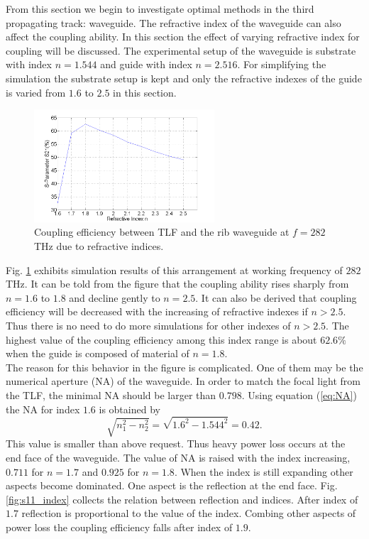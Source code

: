 From this section we begin to investigate optimal methods in the third propagating track: waveguide. The refractive index of the waveguide can also affect the coupling ability. In this section the effect of varying refractive index for coupling will be discussed. The experimental setup of the waveguide is substrate with index $n=1.544$ and guide with index $n=2.516$. For simplifying the simulation the substrate setup is kept and only the refractive indexes of the guide is varied from $1.6$ to $2.5$ in this section.\\

\begin{figure}[!ht]
\centering
\includegraphics[width=0.6\textwidth]{bilder/s21_refractive_index}
\caption{Coupling efficiency between TLF and the rib waveguide at $f=282$THz due to refractive indices.}
\label{fig:refractive_index}
\end{figure}
Fig. \ref{fig:refractive_index} exhibits simulation results of this arrangement at working frequency of $282$ THz. It can be told from the figure that the coupling ability rises sharply from $n=1.6$ to $1.8$ and decline gently to $n=2.5$. It can also be derived that coupling efficiency will be decreased with the increasing of refractive indexes if $n>2.5$. Thus there is no need to do more simulations for other indexes of $n>2.5$. The highest value of the coupling efficiency among this index range is about $62.6\%$ when the guide is composed of material of $n=1.8$.\\

The reason for this behavior in the figure is complicated. One of them may be the numerical aperture (NA) of the waveguide. In order to match the focal light from the TLF, the minimal NA should be larger than $0.798$. Using equation (\ref{eq:NA}) the NA for index $1.6$ is obtained by
\begin{equation*}
\sqrt{n_{1}^2-n_{2}^2}=\sqrt{1.6^2-1.544^2}=0.42.
\end{equation*}
This value is smaller than above request. Thus heavy power loss occurs at the end face of the waveguide. The value of NA is raised with the index increasing, $0.711$ for $n=1.7$ and $0.925$ for $n=1.8$.  When the index is still expanding other aspects become dominated. One aspect is the reflection at the end face. Fig. \ref{fig:s11_index} collects the relation between reflection and indices. After index of $1.7$ reflection is proportional to the value of the index. Combing other aspects of power loss the coupling efficiency falls after index of $1.9$.\\
  
